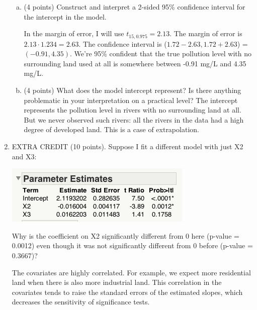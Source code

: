 \documentclass{article}\usepackage{graphicx, color}
\providecommand{\q}{$\quad$ \newline}
\numberwithin{equation}{section}
\begin{document}
\begin{flushleft}
\begin{enumerate}[1. ]
\begin{enumerate}[a. ]
\item (4 points) Construct and interpret a 2-sided 95\% confidence interval for the intercept in the model.

{\color{red}
In the margin of error, I will use $t_{15, 0.975} = 2.13$. The margin of error is $2.13 \cdot 1.234 = 2.63$. The confidence interval is ($1.72 - 2.63, 1.72 + 2.63$) = $(-0.91, 4.35)$. We're 95\% confident that the true pollution level with no surrounding land used at all is somewhere between -0.91 mg/L and 4.35 mg/L.

}

\item (4 points) What does the model intercept represent? Is there anything problematic in your interpretation on a practical level?
{\color{red}
The intercept represents the pollution level in rivers with no surrounding land at all. But we never observed such rivers: all the rivers in the data had a high degree of developed land. This is a case of extrapolation.
}


\end{enumerate}




\item EXTRA CREDIT (10 points). Suppose I fit a different model with just X2 and X3:

\begin{center}
 \includegraphics{../../fig/riversparams2.png}
\end{center}

Why is the coefficient on X2 significantly different from 0 here (p-value = 0.0012) even though it was not significantly different from 0 before (p-value = 0.3667)? \q


{\color{red}
The covariates are highly correlated. For example, we expect more residential land when there is also more industrial land. This correlation in the covariates tends to raise the standard errors of the estimated slopes, which decreases the sensitivity of significance tests.
}




\end{enumerate}
\end{flushleft}
\end{document}
